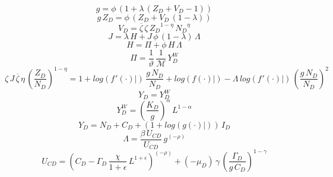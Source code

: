 \documentclass[10pt,a4paper]{article}
\begin{document}
\footnotesize
\begin{dmath}
{g}=\phi\, \left(1+\lambda\, \left({Z_D}+{V_D}-1\right)\right)
\end{dmath}
\begin{dmath}
{g}\, {Z_D}=\phi\, \left({Z_D}+{V_D}\, \left(1-\lambda\right)\right)
\end{dmath}
\begin{dmath}
{V_D}=\overline{\zeta}\, {\zeta}\, {Z_D}^{1-\eta}\, {N_D}^{\eta}
\end{dmath}
\begin{dmath}
{J}=\lambda\, {H}+{J}\, \phi\, \left(1-\lambda\right)\, {\Lambda}
\end{dmath}
\begin{dmath}
{H}={\Pi}+\phi\, {H}\, {\Lambda}
\end{dmath}
\begin{dmath}
{\Pi}=\frac{1}{\vartheta}\, \frac{1}{\mathcal{M}}\, {Y^W_D}
\end{dmath}
\begin{dmath}
{\zeta}\, {J}\, \overline{\zeta}\, \eta\, \left(\frac{{Z_D}}{{N_D}}\right)^{1-\eta}=1+log\left({\left.       f^‎{\prime}\left( \cdot \right)   \right|}\right)\, \frac{{g}\, {N_D}}{{N_D}}+log\left({\left.       f\left( \cdot \right)            \right|}\right)-{\Lambda}\, log\left({\left.       f^‎{\prime}\left( \cdot \right)   \right|}\right)\, \left(\frac{{g}\, {N_D}}{{N_D}}\right)^{2}
\end{dmath}
\begin{dmath}
{Y_D}={Y^W_D}
\end{dmath}
\begin{dmath}
{Y^W_D}=\left(\frac{{K_D}}{{g}}\right)^{\alpha}\, {L}^{1-\alpha}
\end{dmath}
\begin{dmath}
{Y_D}={N_D}+{C_D}+\left(1+log\left({\left.       g\left( \cdot \right)            \right|}\right)\right)\, {I_D}
\end{dmath}
\begin{dmath}
{\Lambda}=\frac{\beta\, {U_{CD}}}{{U_{CD}}}\, {g}^{\left(-\rho\right)}
\end{dmath}
\begin{dmath}
{U_{CD}}=\left({C_D}-{\Gamma_D}\, \frac{\chi}{1+\epsilon}\, {L}^{1+\epsilon}\right)^{\left(-\rho\right)}+\left(-{{\mu}_{D}}\right)\, \gamma\, \left(\frac{{\Gamma_D}}{{g}\, {C_D}}\right)^{1-\gamma}
\end{dmath}
\end{document}
